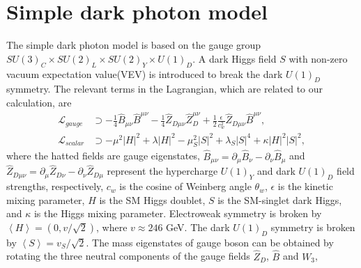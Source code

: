 \documentclass{article}
\begin{document}
  \section{Simple dark photon model} The simple dark photon model\cite{1412.0018} is based on the gauge group $SU(3)_C\times SU(2)_L\times SU(2)_Y\times U(1)_D$. A dark Higgs field $S$ with non-zero vacuum expectation value(VEV) is introduced to break the dark $U(1)_D$ symmetry. The relevant terms in the Lagrangian, which are related to our calculation, are
  \begin{align}
  \mathcal{L}_{gauge}&\supset-\frac{1}{4}\hat{B}_{\mu\nu}\hat{B}^{\mu\nu}-\frac{1}{4}\hat{Z}_{D\mu\nu}\hat{Z}_{D}^{\mu\nu}+\frac{1}{2}\frac{\epsilon}{c_w^2}
  \hat{Z}_{D\mu\nu}\hat{B}^{\mu\nu},\\
  \mathcal{L}_{scalar}&\supset-\mu^{2}\left|H\right|^2+\lambda\left|H\right|^2-\mu_S^2\left|S\right|^2+\lambda_S\left|S\right|^4+\kappa\left|H\right|^2\left|S\right|^2,
  \end{align}
where the hatted fields are gauge eigenstates, $\hat{B}_{\mu\nu}=\partial_{\mu}\hat{B}_{\nu}-
  \partial_{\nu}\hat{B}_{\mu}$ and $\hat{Z}_{D\mu\nu}=\partial_{\mu}\hat{Z}_{D\nu}-\partial_{\nu}\hat{Z}_{D\mu}$ represent the hypercharge $U(1)_Y$ and dark $U(1)_D$ field strengths, respectively, $c_w$ is the cosine of Weinberg angle $\theta_w$,  $\epsilon$ is the kinetic mixing parameter, $H$ is the SM Higgs doublet, $S$ is the SM-singlet dark Higgs, and $\kappa$ is the Higgs mixing parameter.
  Electroweak symmetry is broken by $\left \langle H \right \rangle=\left(0,v/\sqrt{2}\right)$, where $v\approx  246 $ GeV. The dark $U(1)_D$ symmetry is broken by $\left \langle S \right \rangle=v_{S}/\sqrt{2}$. The mass eigenstates of gauge boson can be obtained by rotating the three neutral components of the gauge fields $\hat{Z}_D$, $\hat{B}$ and $W_3$,
   
\end{document}
